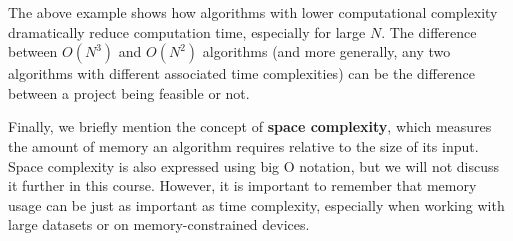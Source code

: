 The above example shows how algorithms with lower computational complexity dramatically reduce computation time, especially for large $N$. The difference between $O(N^3)$ and $O(N^2)$ algorithms (and more generally, any two algorithms with different associated time complexities) can be the difference between a project being feasible or not.

Finally, we briefly mention the concept of \textbf{space complexity}, which measures the amount of memory an algorithm requires relative to the size of its input. Space complexity is also expressed using big O notation, but we will not discuss it further in this course. However, it is important to remember that memory usage can be just as important as time complexity, especially when working with large datasets or on memory-constrained devices.

